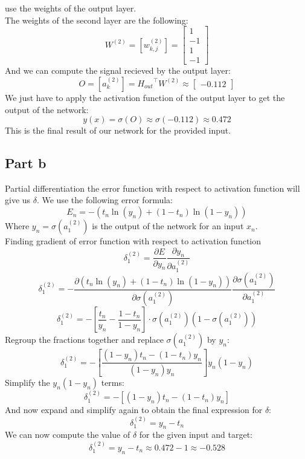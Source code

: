 \documentclass[a4paper, 10pt]{article}
\begin{document}
use the weights of the output layer.
\\
The weights of the second layer are the following:
$$
W^{(2)} = [w_{k,j}^{(2)}] = \begin{bmatrix}
    1\\
    -1\\
    1\\
    -1
\end{bmatrix}
$$
And we can compute the signal recieved by the output layer:
$$
O = [a_k^{(2)}] = {H_{out}}^\top W^{(2)} \approx \begin{bmatrix}
    -0.112
\end{bmatrix}
$$
We just have to apply the activation function of the output layer to get the output of the network:
$$
y(x) = \sigma(O) \approx \sigma(-0.112) \approx 0.472
$$
This is the final result of our network for the provided input.

\subsection{Part b}

Partial differentiation the error function with respect to activation function will give us $\delta$.
We use the following error formula:
$$
E_n=- (t_n\ln (y_n)  +(1-t_n)\ln (1-y_n))
$$
Where $y_n=\sigma(a_1^{(2)})$ is the output of the network for an input $x_n$.
\\
Finding gradient of error function with respect to activation function
$$
\delta _{1}^{(2)}= \frac{\partial E }{\partial y_{n}}\frac{\partial y_{n}}{\partial a_1^{(2)}}
$$
$$
\delta _{1}^{(2)}=  -\frac{\partial (t_n\ln (y_n)  +(1-t_n)\ln (1-y_n))}{\partial \sigma(a_1^{(2)})}\frac{\partial \sigma(a_1^{(2)})}{\partial a_1^{(2)}}
$$
$$
\delta _{1}^{(2)}= -\left[\frac{t_n}{y_n}-\frac{1-t_n}{1-y_n}\right]\cdot\sigma(a_1^{(2)})(1-\sigma(a_1^{(2)}))
$$
Regroup the fractions together and replace $\sigma(a_1^{(2)})$ by $y_n$:
$$
\delta _{1}^{(2)}= -\left[\frac{(1-y_n)t_n -(1-t_n)y_n}{(1-y_n)y_n}\right]y_n(1-y_n) 
$$
Simplify the $y_n(1-y_n)$ terms:
$$
\delta _{1}^{(2)}= -[(1-y_n)t_n - (1-t_n)y_n]
$$
And now expand and simplify again to obtain the final expression for $\delta$:
$$
\delta _{1}^{(2)}= y_n-t_n
$$
We can now compute the value of $\delta$ for the given input and target:
$$
\delta _{1}^{(2)}= y_n-t_n \approx 0.472 - 1 \approx -0.528
$$
\end{document}
